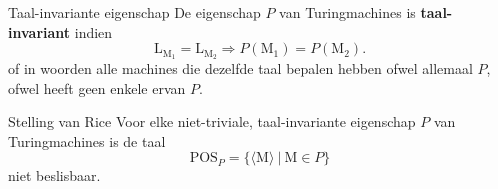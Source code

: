 \begin{theo}{Taal-invariante eigenschap}
    De eigenschap $P$ van Turingmachines is \textbf{taal-invariant} indien 
    \begin{equation*}
        \text{L}_{\text{M}_1} = \text{L}_{\text{M}_2}
        \Rightarrow
        P(\text{M}_1) = P(\text{M}_2).
    \end{equation*}
    of in woorden alle machines die dezelfde taal bepalen hebben ofwel allemaal $P$, ofwel heeft geen enkele ervan $P$.
\end{theo}

\begin{lem}{Stelling van Rice}
    Voor elke niet-triviale, taal-invariante eigenschap $P$ van Turingmachines is de taal 
    \begin{equation*}
        \text{POS}_P = \{\langle \text{M} \rangle \ | \ \text{M} \in P\}
    \end{equation*}
    niet beslisbaar.
\end{lem}


